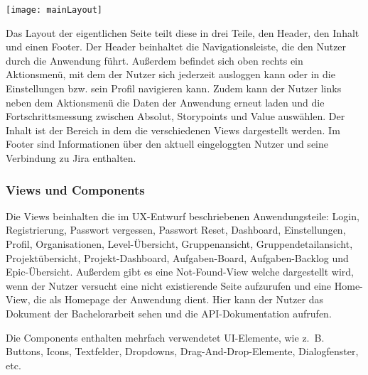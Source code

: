 \vspace{20pt}
\begin{center}
    \begin{minipage}{0.8\linewidth}
        \texttt{[image: mainLayout]}
    \end{minipage}
\end{center}
\vspace{20pt}

Das Layout der eigentlichen Seite teilt diese in drei Teile, den Header, den Inhalt und einen Footer. Der Header beinhaltet die Navigationsleiste, die den Nutzer durch die Anwendung führt. Außerdem befindet sich oben rechts ein Aktionsmenü, mit dem der Nutzer sich jederzeit ausloggen kann oder in die Einstellungen bzw. sein Profil navigieren kann. Zudem kann der Nutzer links neben dem Aktionsmenü die Daten der Anwendung erneut laden und die Fortschrittsmessung zwischen Absolut, Storypoints und Value auswählen. Der Inhalt ist der Bereich in dem die verschiedenen Views dargestellt werden. Im Footer sind Informationen über den aktuell eingeloggten Nutzer und seine Verbindung zu Jira enthalten.

\subsubsection{Views und Components}
Die Views beinhalten die im UX-Entwurf beschriebenen Anwendungsteile: Login, Registrierung, Passwort vergessen, Passwort Reset, Dashboard, Einstellungen, Profil, Organisationen, Level-Übersicht, Gruppenansicht, Gruppendetailansicht, Projektübersicht, Projekt-Dashboard, Aufgaben-Board, Aufgaben-Backlog und Epic-Übersicht. Außerdem gibt es eine Not-Found-View welche dargestellt wird, wenn der Nutzer versucht eine nicht existierende Seite aufzurufen und eine Home-View, die als Homepage der Anwendung dient. Hier kann der Nutzer das Dokument der Bachelorarbeit sehen und die API-Dokumentation aufrufen.

Die Components enthalten mehrfach verwendetet UI-Elemente, wie z. B. Buttons, Icons, Textfelder, Dropdowns, Drag-And-Drop-Elemente, Dialogfenster, etc.

